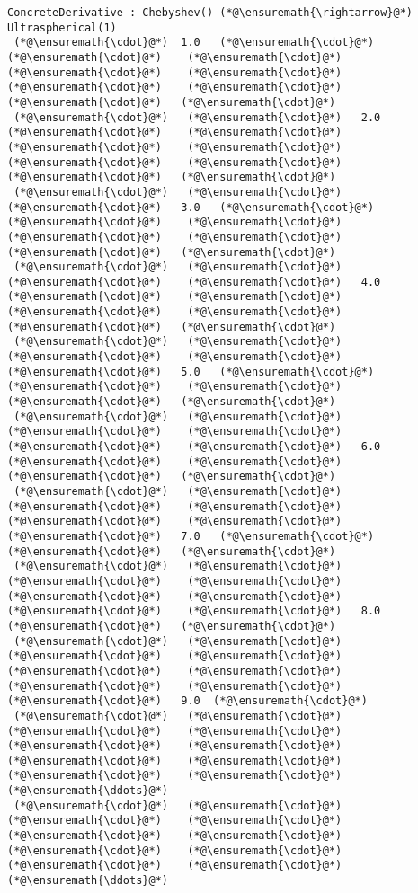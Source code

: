 \documentclass[12pt,landscape]{article}
\begin{document}
{\begin{lstlisting}
ConcreteDerivative : Chebyshev() (*@\ensuremath{\rightarrow}@*) Ultraspherical(1)
 (*@\ensuremath{\cdot}@*)  1.0   (*@\ensuremath{\cdot}@*)    (*@\ensuremath{\cdot}@*)    (*@\ensuremath{\cdot}@*)    (*@\ensuremath{\cdot}@*)    (*@\ensuremath{\cdot}@*)    (*@\ensuremath{\cdot}@*)    (*@\ensuremath{\cdot}@*)    (*@\ensuremath{\cdot}@*)   (*@\ensuremath{\cdot}@*)
 (*@\ensuremath{\cdot}@*)   (*@\ensuremath{\cdot}@*)   2.0   (*@\ensuremath{\cdot}@*)    (*@\ensuremath{\cdot}@*)    (*@\ensuremath{\cdot}@*)    (*@\ensuremath{\cdot}@*)    (*@\ensuremath{\cdot}@*)    (*@\ensuremath{\cdot}@*)    (*@\ensuremath{\cdot}@*)   (*@\ensuremath{\cdot}@*)
 (*@\ensuremath{\cdot}@*)   (*@\ensuremath{\cdot}@*)    (*@\ensuremath{\cdot}@*)   3.0   (*@\ensuremath{\cdot}@*)    (*@\ensuremath{\cdot}@*)    (*@\ensuremath{\cdot}@*)    (*@\ensuremath{\cdot}@*)    (*@\ensuremath{\cdot}@*)    (*@\ensuremath{\cdot}@*)   (*@\ensuremath{\cdot}@*)
 (*@\ensuremath{\cdot}@*)   (*@\ensuremath{\cdot}@*)    (*@\ensuremath{\cdot}@*)    (*@\ensuremath{\cdot}@*)   4.0   (*@\ensuremath{\cdot}@*)    (*@\ensuremath{\cdot}@*)    (*@\ensuremath{\cdot}@*)    (*@\ensuremath{\cdot}@*)    (*@\ensuremath{\cdot}@*)   (*@\ensuremath{\cdot}@*)
 (*@\ensuremath{\cdot}@*)   (*@\ensuremath{\cdot}@*)    (*@\ensuremath{\cdot}@*)    (*@\ensuremath{\cdot}@*)    (*@\ensuremath{\cdot}@*)   5.0   (*@\ensuremath{\cdot}@*)    (*@\ensuremath{\cdot}@*)    (*@\ensuremath{\cdot}@*)    (*@\ensuremath{\cdot}@*)   (*@\ensuremath{\cdot}@*)
 (*@\ensuremath{\cdot}@*)   (*@\ensuremath{\cdot}@*)    (*@\ensuremath{\cdot}@*)    (*@\ensuremath{\cdot}@*)    (*@\ensuremath{\cdot}@*)    (*@\ensuremath{\cdot}@*)   6.0   (*@\ensuremath{\cdot}@*)    (*@\ensuremath{\cdot}@*)    (*@\ensuremath{\cdot}@*)   (*@\ensuremath{\cdot}@*)
 (*@\ensuremath{\cdot}@*)   (*@\ensuremath{\cdot}@*)    (*@\ensuremath{\cdot}@*)    (*@\ensuremath{\cdot}@*)    (*@\ensuremath{\cdot}@*)    (*@\ensuremath{\cdot}@*)    (*@\ensuremath{\cdot}@*)   7.0   (*@\ensuremath{\cdot}@*)    (*@\ensuremath{\cdot}@*)   (*@\ensuremath{\cdot}@*)
 (*@\ensuremath{\cdot}@*)   (*@\ensuremath{\cdot}@*)    (*@\ensuremath{\cdot}@*)    (*@\ensuremath{\cdot}@*)    (*@\ensuremath{\cdot}@*)    (*@\ensuremath{\cdot}@*)    (*@\ensuremath{\cdot}@*)    (*@\ensuremath{\cdot}@*)   8.0   (*@\ensuremath{\cdot}@*)   (*@\ensuremath{\cdot}@*)
 (*@\ensuremath{\cdot}@*)   (*@\ensuremath{\cdot}@*)    (*@\ensuremath{\cdot}@*)    (*@\ensuremath{\cdot}@*)    (*@\ensuremath{\cdot}@*)    (*@\ensuremath{\cdot}@*)    (*@\ensuremath{\cdot}@*)    (*@\ensuremath{\cdot}@*)    (*@\ensuremath{\cdot}@*)   9.0  (*@\ensuremath{\cdot}@*)
 (*@\ensuremath{\cdot}@*)   (*@\ensuremath{\cdot}@*)    (*@\ensuremath{\cdot}@*)    (*@\ensuremath{\cdot}@*)    (*@\ensuremath{\cdot}@*)    (*@\ensuremath{\cdot}@*)    (*@\ensuremath{\cdot}@*)    (*@\ensuremath{\cdot}@*)    (*@\ensuremath{\cdot}@*)    (*@\ensuremath{\cdot}@*)   (*@\ensuremath{\ddots}@*)
 (*@\ensuremath{\cdot}@*)   (*@\ensuremath{\cdot}@*)    (*@\ensuremath{\cdot}@*)    (*@\ensuremath{\cdot}@*)    (*@\ensuremath{\cdot}@*)    (*@\ensuremath{\cdot}@*)    (*@\ensuremath{\cdot}@*)    (*@\ensuremath{\cdot}@*)    (*@\ensuremath{\cdot}@*)    (*@\ensuremath{\cdot}@*)   (*@\ensuremath{\ddots}@*)
\end{lstlisting}


}
\end{document}
